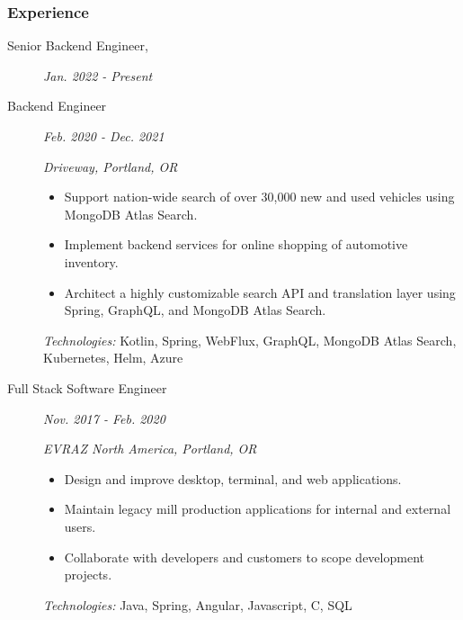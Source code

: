 \documentclass{article}
\begin{document}

\subsubsection*{Experience}

    \begin{description}
		
	\item[Senior Backend Engineer,] \hfill \textit{Jan. 2022 - Present}
	\item[Backend Engineer] \hfill \textit{Feb. 2020 - Dec. 2021}
		
        \textit{Driveway, Portland, OR}
        \begin{itemize}
        \item Support nation-wide search of over 30,000 new and used vehicles using MongoDB Atlas Search.
        \item Implement backend services for online shopping of automotive inventory.
        \item Architect a highly customizable search API and translation layer using Spring, GraphQL, and MongoDB Atlas Search.
          
        \end{itemize}
        \textit{Technologies:} Kotlin, Spring, WebFlux, GraphQL, MongoDB Atlas Search, Kubernetes, Helm, Azure
		\vspace{0.5em}

	\item[Full Stack Software Engineer] \hfill \textit{Nov. 2017 - Feb. 2020}
		
        \textit{EVRAZ North America, Portland, OR}
        \begin{itemize}     
            \item Design and improve desktop, terminal, and web applications.
            \item Maintain legacy mill production applications for internal and external users.
            \item Collaborate with developers and customers to scope development projects.
        \end{itemize}
        \textit{Technologies:} Java, Spring, Angular, Javascript, C, SQL
        
    \end{description}
\end{document}
